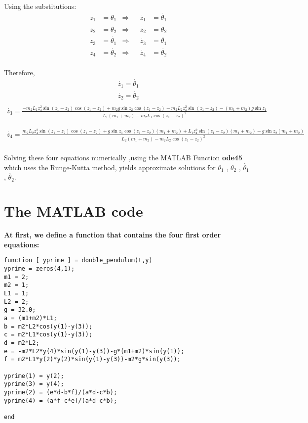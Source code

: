 \documentclass[11]{article}
\begin{document}
\noindent Using the substitutions:
\begin{align}
z_{1} &=\theta_{1} &\Rightarrow& &\dot{z_{1}}&=\dot{\theta_{1}}\\
z_{2}&=\theta_{2} &\Rightarrow& &\dot{z_{2}}&=\dot{\theta_{2}}\\
z_{3}&=\dot{\theta_{1}} &\Rightarrow& &\dot{z_{3}}&=\ddot{\theta_{1}}\\
z_{4}&=\dot{\theta_{2}} &\Rightarrow& &\dot{z_{4}}&=\ddot{\theta_{2}}
\end{align}
\\
Therefore, 
\begin{align}
\dot{z_{1}}=\dot{\theta_{1}}\\
\dot{z_{2}}=\dot{\theta_{2}}\\
\end{align}
\begin{align}
\dot{z_{3}}=\frac{-m_{2}L_{1}z_{4}^{2}\sin(z_{1}-z_{2})\cos(z_{1}-z_{2})+m_{2}g\sin z_{2}\cos(z_{1}-z_{2})-m_{2}L_{2}z_{4}^{2}\sin(z_{1}-z_{2})-(m_{1}+m_{2})g\sin z_{1}}{L_{1}(m_{1}+m_{2})-m_{2}L_{1}\cos(z_{1}-z_{2})^2}
\end{align}

\begin{align}
\dot{z_{4}}=\frac{m_{2}L_{2}z_{4}^{2}\sin(z_{1}-z_{2})\cos(z_{1}-z_{2})+g\sin z_{1} \cos(z_{1}-z_{2})(m_{1}+m_{2})+L_{1}z_{4}^{2}\sin(z_{1}-z_{2})(m_{1}+m_{2})-g\sin z_{2}(m_{1}+m_{2})}{L_{2}(m_{1}+m_{2})-m_{2}L_{2}\cos(z_{1}-z_{2})^{2}}
\end{align}
\\

\noindent Solving these four equations numerically ,using the MATLAB Function \textbf{ode45} which uses the Runge-Kutta method, yields approximate solutions for $\theta_{1}$ , $\theta_{2}$ , $\dot{\theta_{1}}$ , $\dot{\theta_{2}}$.

\section{The MATLAB code}

\textbf{At first, we define a function that contains the four first order equations:}

\begin{verbatim}
function [ yprime ] = double_pendulum(t,y)
yprime = zeros(4,1);
m1 = 2;
m2 = 1;
L1 = 1;
L2 = 2;
g = 32.0;
a = (m1+m2)*L1;
b = m2*L2*cos(y(1)-y(3));
c = m2*L1*cos(y(1)-y(3));
d = m2*L2;
e = -m2*L2*y(4)*sin(y(1)-y(3))-g*(m1+m2)*sin(y(1));
f = m2*L1*y(2)*y(2)*sin(y(1)-y(3))-m2*g*sin(y(3));

yprime(1) = y(2);
yprime(3) = y(4);
yprime(2) = (e*d-b*f)/(a*d-c*b);
yprime(4) = (a*f-c*e)/(a*d-c*b);

end  
\end{verbatim}
\end{document}
